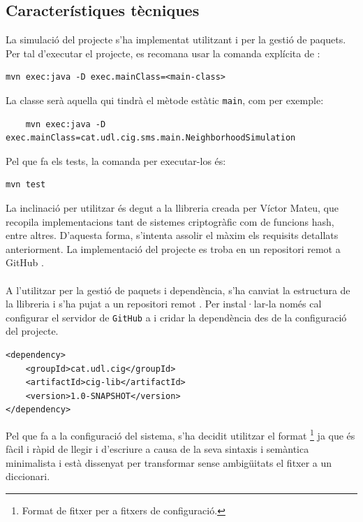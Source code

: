 \subsection{Característiques tècniques}
La simulació del projecte s'ha implementat utilitzant \texttt{\java} i \texttt{\mavenLarge} per la gestió de paquets. Per tal d'executar el projecte, es recomana usar la comanda explícita de \maven:
\begin{verbatim}
mvn exec:java -D exec.mainClass=<main-class>
\end{verbatim}
La classe serà aquella qui tindrà el mètode estàtic \texttt{main}, com per exemple:
\begin{verbatim}
	mvn exec:java -D exec.mainClass=cat.udl.cig.sms.main.NeighborhoodSimulation
\end{verbatim}
Pel que fa els tests, la comanda per executar-los és:
\begin{verbatim}
mvn test
\end{verbatim}
La inclinació per utilitzar \texttt{\java} és degut a la llibreria \ciglib creada per Víctor Mateu, que recopila implementacions tant de sistemes criptogràfic com de funcions hash, entre altres. D'aquesta forma, s'intenta assolir el màxim els requisits detallats anteriorment. La implementació del projecte es troba en un repositori remot a GitHub \cite{smart}.
\\
\\
A l'utilitzar \maven per la gestió de paquets i dependència, s'ha canviat la estructura de la llibreria i s'ha pujat a un repositori remot \cite{ciglib}. Per instal·lar-la només cal configurar el servidor de \texttt{GitHub} a \maven i cridar la dependència des de la configuració del projecte.
\lstset{language=xml}
\begin{lstlisting}
<dependency>
	<groupId>cat.udl.cig</groupId>
	<artifactId>cig-lib</artifactId>
	<version>1.0-SNAPSHOT</version>
</dependency>
\end{lstlisting}
Pel que fa a la configuració del sistema, s'ha decidit utilitzar el format \toml\footnote{Format de fitxer per a fitxers de configuració.} ja que és fàcil i ràpid de llegir i d'escriure a causa de la seva sintaxis i semàntica minimalista i està dissenyat per transformar sense ambigüitats el fitxer a un diccionari.
